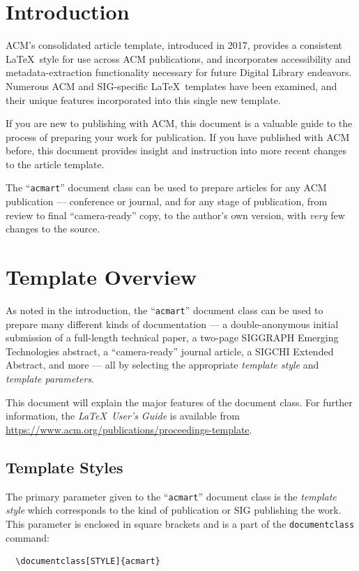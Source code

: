 \section{Introduction}
ACM's consolidated article template, introduced in 2017, provides a
consistent \LaTeX\ style for use across ACM publications, and
incorporates accessibility and metadata-extraction functionality
necessary for future Digital Library endeavors. Numerous ACM and
SIG-specific \LaTeX\ templates have been examined, and their unique
features incorporated into this single new template.

If you are new to publishing with ACM, this document is a valuable
guide to the process of preparing your work for publication. If you
have published with ACM before, this document provides insight and
instruction into more recent changes to the article template.

The ``\verb|acmart|'' document class can be used to prepare articles
for any ACM publication --- conference or journal, and for any stage
of publication, from review to final ``camera-ready'' copy, to the
author's own version, with {\itshape very} few changes to the source.

\section{Template Overview}
As noted in the introduction, the ``\verb|acmart|'' document class can
be used to prepare many different kinds of documentation --- a
double-anonymous initial submission of a full-length technical paper, a
two-page SIGGRAPH Emerging Technologies abstract, a ``camera-ready''
journal article, a SIGCHI Extended Abstract, and more --- all by
selecting the appropriate {\itshape template style} and {\itshape
  template parameters}.

This document will explain the major features of the document
class. For further information, the {\itshape \LaTeX\ User's Guide} is
available from
\url{https://www.acm.org/publications/proceedings-template}.

\subsection{Template Styles}

The primary parameter given to the ``\verb|acmart|'' document class is
the {\itshape template style} which corresponds to the kind of publication
or SIG publishing the work. This parameter is enclosed in square
brackets and is a part of the {\verb|documentclass|} command:
\begin{verbatim}
  \documentclass[STYLE]{acmart}
\end{verbatim}

